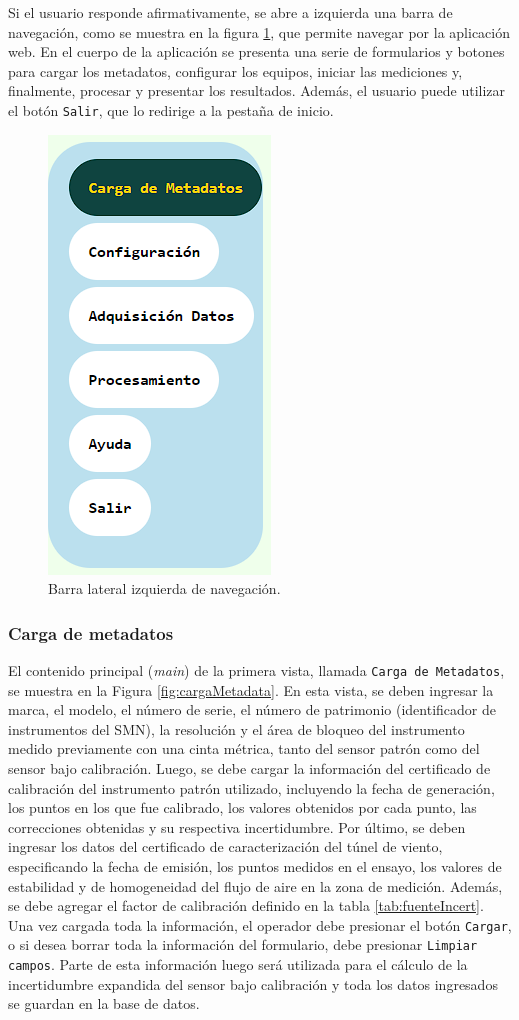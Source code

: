 Si el usuario responde afirmativamente, se abre a izquierda una barra de navegación, como se muestra en la figura \ref{fig:barraNavegIzq}, que permite navegar por la aplicación web. En el cuerpo de la aplicación se presenta una serie de formularios y botones para cargar los metadatos, configurar los equipos, iniciar las mediciones y, finalmente, procesar y presentar los resultados. Además, el usuario puede utilizar el botón \texttt{Salir}, que lo redirige a la pestaña de inicio.

\begin{figure}[H]
    \centering
    \includegraphics[width=0.2\linewidth]{Figuras/AplicacionWeb/frondend/barraNavegIzq.png}
    \caption{Barra lateral izquierda de navegación.}
    \label{fig:barraNavegIzq}
\end{figure}
\subsubsection{Carga de metadatos}\label{sec:cargaMetadatos}

El contenido principal (\textit{main}) de la primera vista, llamada \texttt{Carga de Metadatos}, se muestra en la Figura \ref{fig:cargaMetadata}. En esta vista, se deben ingresar la marca, el modelo, el número de serie, el número de patrimonio (identificador de instrumentos del SMN), la resolución y el área de bloqueo del instrumento medido previamente con una cinta métrica, tanto del sensor patrón como del sensor bajo calibración. Luego, se debe cargar la información del certificado de calibración del instrumento patrón utilizado, incluyendo la fecha de generación, los puntos en los que fue calibrado, los valores obtenidos por cada punto, las correcciones obtenidas y su respectiva incertidumbre. Por último, se deben ingresar los datos del certificado de caracterización del túnel de viento, especificando la fecha de emisión, los puntos medidos en el ensayo, los valores de estabilidad y de homogeneidad del flujo de aire en la zona de medición. Además, se debe agregar el factor de calibración definido en la tabla \ref{tab:fuenteIncert}. Una vez cargada toda la información, el operador debe presionar el botón \texttt{Cargar}, o si desea borrar toda la información del formulario, debe presionar \texttt{Limpiar campos}. Parte de esta información luego será utilizada para el cálculo de la incertidumbre expandida del sensor bajo calibración y toda los datos ingresados se guardan en la base de datos.


